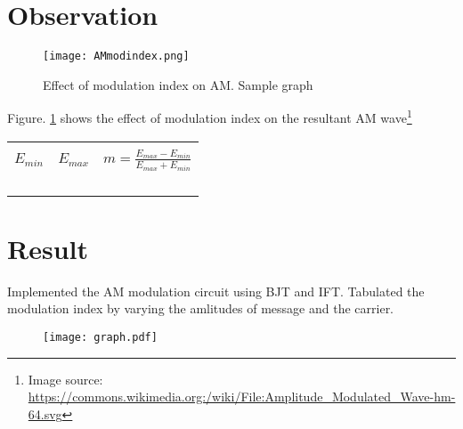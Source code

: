 \section*{Observation}


\begin{figure}[h]

\texttt{[image: AMmodindex.png]}
\caption{Effect of modulation index on AM. Sample graph}
\label{AMmodindex1}
\end{figure}
\noindent Figure. \ref{AMmodindex1}  shows the effect of modulation index on the resultant AM wave\footnote{Image source: \url{https://commons.wikimedia.org:/wiki/File:Amplitude_Modulated_Wave-hm-64.svg}}
\begin{center}

\begin{tabular}{|l|l|l|}

\hline
 & &\\
 
$E_{min}$  & $E_{max}$ & $m=\frac{E_{max}-E_{min}}{E_{max}+E_{min}}$ \\
 & & \\ \hline
 & & \\ \hline
& & \\ \hline
& & \\ \hline
\end{tabular}
\end{center}

\section*{Result}
Implemented the AM modulation circuit using BJT and IFT. Tabulated the modulation index by varying the amlitudes of message and the carrier.

\begin{figure}
\texttt{[image: graph.pdf]}
\end{figure}



